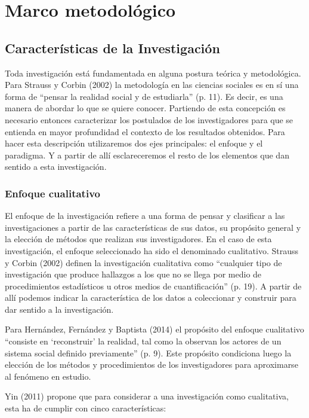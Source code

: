 \chapter{Marco metodológico}\label{ch:metodologia}


\section{Características de la Investigación}
Toda investigación está fundamentada en alguna postura teórica y metodológica.
Para Strauss y Corbin (2002) la metodología en las ciencias sociales es en sí
una forma de “pensar la realidad social y de estudiarla” (p. 11).
Es decir, es una manera de abordar lo que se quiere conocer.
Partiendo de esta concepción es necesario entonces caracterizar los postulados
de los investigadores para que se entienda en mayor profundidad el contexto de
los resultados obtenidos.
Para hacer esta descripción utilizaremos dos ejes principales: el enfoque y el
paradigma.
Y a partir de allí esclareceremos el resto de los elementos que dan sentido a
esta investigación.

\subsection{Enfoque cualitativo}
El enfoque de la investigación refiere a una forma de pensar y clasificar a las
investigaciones a partir de las características de sus datos, su propósito
general y la elección de métodos que realizan sus investigadores.
En el caso de esta investigación, el enfoque seleccionado ha sido el denominado
cualitativo.
Strauss y Corbin (2002) definen la investigación cualitativa como “cualquier
tipo de investigación que produce hallazgos a los que no se llega por medio de
procedimientos estadísticos u otros medios de cuantificación” (p. 19).
A partir de allí podemos indicar la característica de los datos a coleccionar y
construir para dar sentido a la investigación.

Para Hernández, Fernández y Baptista (2014) el propósito del enfoque cualitativo
“consiste en ‘reconstruir’ la realidad, tal como la observan los actores de un
sistema social definido previamente” (p. 9).
Este propósito condiciona luego la elección de los métodos y procedimientos de
los investigadores para aproximarse al fenómeno en estudio.

Yin (2011) propone que para considerar a una investigación como cualitativa,
esta ha de cumplir con cinco características:


